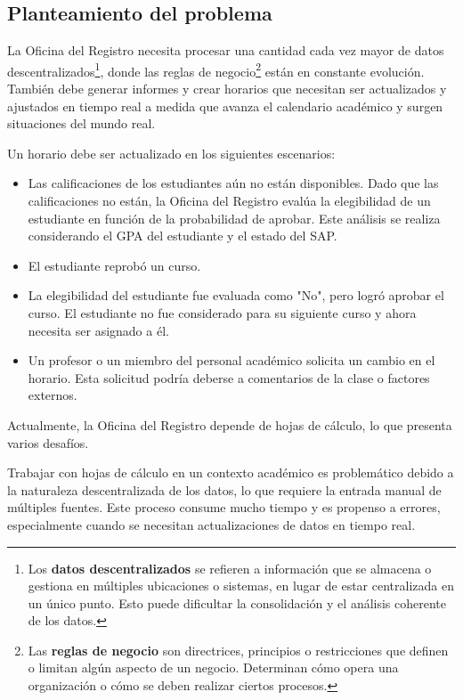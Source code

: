 \subsection{Planteamiento del problema}
\label{sec:problemDefinition}
La Oficina del Registro necesita procesar una cantidad cada vez mayor de datos descentralizados\footnote{Los \textbf{datos descentralizados} se refieren a información que se almacena o gestiona en múltiples ubicaciones o sistemas, en lugar de estar centralizada en un único punto.
Esto puede dificultar la consolidación y el análisis coherente de los datos.}, donde las reglas de negocio\footnote{Las \textbf{reglas de negocio} son directrices, principios o restricciones que definen o limitan algún aspecto de un negocio.
Determinan cómo opera una organización o cómo se deben realizar ciertos procesos.} están en constante evolución.
También debe generar informes y crear horarios que necesitan ser actualizados y ajustados en tiempo real a medida que avanza el calendario académico y surgen situaciones del mundo real.

Un horario debe ser actualizado en los siguientes escenarios:
\begin{itemize}
    \item Las calificaciones de los estudiantes aún no están disponibles.
Dado que las calificaciones no están, la Oficina del Registro evalúa la elegibilidad de un estudiante en función de la probabilidad de aprobar.
Este análisis se realiza considerando el GPA del estudiante y el estado del SAP.
    \item El estudiante reprobó un curso.
    \item La elegibilidad del estudiante fue evaluada como "No", pero logró aprobar el curso.
El estudiante no fue considerado para su siguiente curso y ahora necesita ser asignado a él.
    \item Un profesor o un miembro del personal académico solicita un cambio en el horario.
Esta solicitud podría deberse a comentarios de la clase o factores externos.
\end{itemize}

Actualmente, la Oficina del Registro depende de hojas de cálculo, lo que presenta varios desafíos.

Trabajar con hojas de cálculo en un contexto académico es problemático debido a la naturaleza descentralizada de los datos, lo que requiere la entrada manual de múltiples fuentes.
Este proceso consume mucho tiempo y es propenso a errores, especialmente cuando se necesitan actualizaciones de datos en tiempo real.

